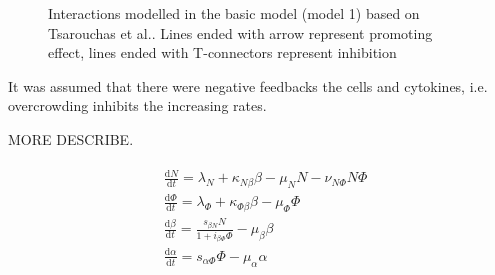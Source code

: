 \begin{figure}
    \begin{center}
    \end{center}

    \caption[Interactions modelled in the basic model]%
    {Interactions modelled in the basic model (model 1) based on Tsarouchas et al.\cite{ref:Tsarouchas}. Lines ended with arrow represent promoting effect, lines ended with T-connectors represent inhibition}
    \label{fig:m1}

\end{figure}

It was assumed that there were negative feedbacks the cells and cytokines, i.e. overcrowding inhibits the increasing rates. 

MORE DESCRIBE.

\begin{align}
    \label{eq:model1}
    \begin{split}
        &\frac{\mathrm{d} N}{\mathrm{d} t}=\lambda_N+\kappa_{N\beta}\beta-\mu_NN-\nu_{N\Phi}N\Phi\\
        &\frac{\mathrm{d} \Phi}{\mathrm{d} t}=\lambda_\Phi+\kappa_{\Phi\beta}\beta-\mu_\Phi\Phi\\
        &\frac{\mathrm{d} \beta}{\mathrm{d} t}=\frac{s_{\beta N}N}{1+i_{\beta\Phi}\Phi}-\mu_\beta\beta\\
        &\frac{\mathrm{d} \alpha}{\mathrm{d} t}=s_{\alpha\Phi}\Phi-\mu_\alpha\alpha
    \end{split}
\end{align}

